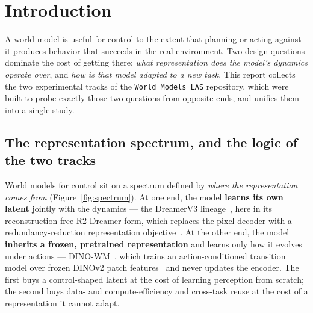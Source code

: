 \documentclass[11pt,a4paper]{article}
\begin{document}
\begin{abstract}
the \emph{same order of magnitude} of latent-prediction MSE differ $2.75\times$
in planning success;
and a local surrogate whose one-step disagreement with the global model is only
${\approx}0.002$ nonetheless yields gradient directions reliable enough to be
accepted just $2.8\%$ of the time. On the planner side, a global re-score gate
keeps cheap first-order refinement \emph{bounded-worsening} under the global
model's objective (rejecting any refinement that worsens it by more than
$\tau{=}0.05$), and here recovers global-CEM-quality plans ($0.97$ success)
where an unguarded hybrid collapses to $0.54$, while purely local planners run
$100$--$1000\times$ cheaper per episode. All results
are single-seed and at fixed budgets; we state the resulting limits throughout.
\end{abstract}

\section{Introduction}
\label{sec:intro}

A world model is useful for control to the extent that planning or acting
against it produces behavior that succeeds in the real environment. Two design
questions dominate the cost of getting there: \emph{what representation does the
model's dynamics operate over}, and \emph{how is that model adapted to a new
task}. This report collects the two experimental tracks of the
\texttt{World\_Models\_LAS} repository, which were built to probe exactly those two
questions from opposite ends, and unifies them into a single study.

\subsection{The representation spectrum, and the logic of the two tracks}
\label{sec:spectrum}

World models for control sit on a spectrum defined by \emph{where the
representation comes from} (Figure~\ref{fig:spectrum}). At one end, the model
\textbf{learns its own latent} jointly with the dynamics --- the DreamerV3
lineage~\cite{dreamer,dreamerv2,dreamerv3}, here in its reconstruction-free
R2-Dreamer form, which replaces the pixel decoder with a redundancy-reduction
representation objective~\cite{barlow}. At the other end, the model
\textbf{inherits a frozen, pretrained representation} and learns only how it
evolves under actions --- DINO-WM~\cite{dinowm2025}, which trains an
action-conditioned transition model over frozen DINOv2 patch
features~\cite{dinov2} and never updates the encoder. The first buys a
control-shaped latent at the cost of learning perception from scratch; the
second buys data- and compute-efficiency and cross-task reuse at the cost of a
representation it cannot adapt.
\end{document}
